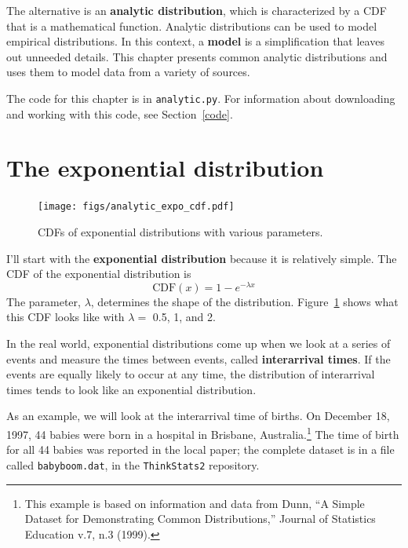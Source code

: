 \documentclass[12pt]{book}
\newcommand{\CDF}{\mathrm{CDF}}
\theoremstyle{exercise}
\begin{document}
The alternative is an {\bf analytic distribution}, which is
characterized by a CDF that is a mathematical function.
Analytic distributions can be used to model empirical distributions.
In this context, a {\bf model} is a simplification that leaves out
unneeded details.  This chapter presents common analytic distributions
and uses them to model data from a variety of sources.%

The code for this chapter is in {\tt analytic.py}.  For information
about downloading and working with this code, see Section~\ref{code}.



\section{The exponential distribution}%
\label{exponential}%
%

\begin{figure}
\centerline{\texttt{[image: figs/analytic\_expo\_cdf.pdf]}}
\caption{CDFs of exponential distributions with various parameters.}%
\label{analytic_expo_cdf}
\end{figure}

I'll start with the {\bf exponential distribution} because it is
relatively simple.  The CDF of the exponential distribution is
%
\[ \CDF(x) = 1 - e^{-\lambda x} \]
%
The parameter, $\lambda$, determines the shape of the distribution.
Figure~\ref{analytic_expo_cdf} shows what this CDF looks like with
$\lambda = $ 0.5, 1, and 2.%

In the real world, exponential distributions
come up when we look at a series of events and measure the
times between events, called {\bf interarrival times}.
If the events are equally likely to occur at any time, the distribution
of interarrival times tends to look like an exponential distribution.%

As an example, we will look at the interarrival time of births.
On December 18, 1997, 44 babies were born in a hospital in Brisbane,
Australia.\footnote{This example is based on information and data from
  Dunn, ``A Simple Dataset for Demonstrating Common Distributions,''
  Journal of Statistics Education v.7, n.3 (1999).}  The time of
birth for all 44 babies was reported in the local paper; the
complete dataset is in a file called {\tt babyboom.dat}, in the
{\tt ThinkStats2} repository.%
%
%
\end{document}
